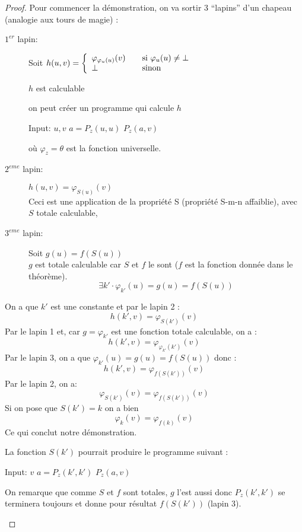 \begin{proof}
Pour commencer la démonstration, on va sortir 3 ``lapins'' d'un chapeau (analogie aux tours de magie) :
\begin{description}

	\item[$1^{er}$ lapin:] Soit $ h(u,v) = \left\{
	\begin{array}{l l}
		\varphi_{\varphi_{u}(u)}(v) & \quad \text{si }\varphi_u(u)\neq \bot\\
    	\bot & \quad \text{sinon}
	\end{array} \right.$

		$h$ est calculable
		\begin{myrem}
			on peut créer un programme qui calcule $h$
            \begin{algorithmic}
              \STATE Input: $u,v$
              \STATE $a = P_z(u,u)$
              \STATE $P_z(a,v)$
            \end{algorithmic}
            où $\varphi_z = \theta$ est la fonction universelle.
		\end{myrem}

	\item[$2^{eme}$ lapin:] $h(u,v)=\varphi_{S(u)}(v)$\\
	Ceci est une application de la propriété S (propriété S-m-n affaiblie), avec $S$ totale calculable,

	\item[$3^{eme}$ lapin:] Soit $g(u)=f(S(u))$\\
	 $g$ est totale calculable car $S$ et $f$ le sont ($f$
		est la fonction donnée dans le théorème).
		\[ \exists k' \cdot \varphi_{k'}(u) =g(u)=f(S(u)) \]
\end{description}
On a que $k'$ est une constante et par le lapin 2 :
\[h(k',v) = \varphi_{S(k')}(v)\]
Par le lapin 1 et, car $g=\varphi_{k'}$ est une fonction totale calculable, on a :
\[h(k',v) = \varphi_{\varphi_{k'}(k')}(v)\]
Par le lapin 3, on a que $\varphi_{k'}(u) = g(u)=f(S(u))$ donc :
\[h(k',v) = \varphi_{f(S(k'))}(v)\]
Par le lapin 2, on a:
\[ \varphi_{S(k')}(v) =\varphi_{f(S(k'))}(v) \]
Si on pose que $S(k')=k$ on a bien
\[ \varphi_{k}(v) = \varphi_{f(k)}(v) \]
Ce qui conclut notre démonstration.
		\begin{myrem}
          La fonction $S(k')$ pourrait produire le programme suivant :
          \begin{algorithmic}
            \STATE Input: $v$
            \STATE $a = P_z(k',k')$
            \STATE $P_z(a,v)$
          \end{algorithmic}
          On remarque que comme $S$ et $f$ sont totales,
          $g$ l'est aussi donc $P_z(k',k')$ se terminera toujours et donne pour résultat $f(S(k'))$ (lapin 3).


\end{myrem}
\end{proof}
